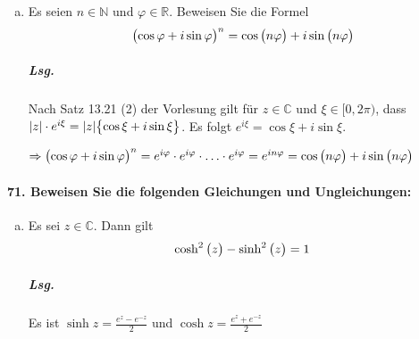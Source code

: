 \documentclass{scrreprt}
\begin{document}
\begin{enumerate}[(a)]
\item Es seien $n \in \mathbb{N}$ und $\varphi \in \mathbb{R}$.
  Beweisen Sie die Formel
  \[
    \qty\big(\cos \varphi + i \sin \varphi)^n = \cos\qty\big(n\varphi) + i \sin\qty\big(n\varphi)
  \]

  \subparagraph{Lsg.} Nach Satz 13.21 (2) der Vorlesung gilt für
  $z \in \mathbb{C}$ und $\xi \in \big[0, 2\pi \big)$, dass
  $\abs{z} \cdot e^{i\xi} = \abs{z}\qty\big{\cos\xi + i\sin\xi}$.
  Es folgt $e^{i\xi} = \cos\xi + i\sin\xi$.

  $\Rightarrow \qty\big(\cos \varphi + i \sin \varphi)^n =
  e^{i\varphi} \cdot e^{i\varphi} \cdot \ldots \cdot e^{i\varphi}
  = e^{in\varphi} = \cos\qty\big(n\varphi) + i\sin\qty\big(n\varphi)$
\end{enumerate}

\newpage
\paragraph{71. Beweisen Sie die folgenden Gleichungen und Ungleichungen:}

\begin{enumerate}[(a)]
\item Es sei $z \in \mathbb{C}$.
  Dann gilt
  \[
    \cosh^2\qty\big(z) - \sinh^2\qty\big(z) = 1
  \]

  \subparagraph{Lsg.} Es ist $\sinh z = \frac{e^z - e^{-z}}{2}$ und
  $\cosh z = \frac{e^z + e^{-z}}{2}$
\end{enumerate}
\end{document}
